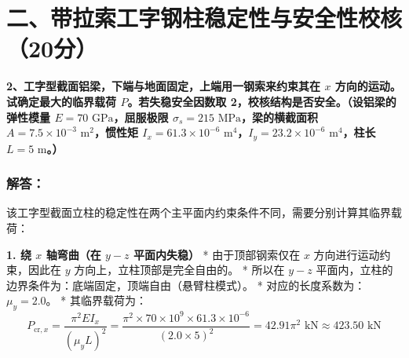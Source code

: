 \documentclass[UTF8,fontset=windows]{ctexart}
\begin{document}
\section*{二、带拉索工字钢柱稳定性与安全性校核（20分）}

\textbf{2、工字型截面铝梁，下端与地面固定，上端用一钢索来约束其在 $x$ 方向的运动。试确定最大的临界载荷 $P$。若失稳安全因数取 2，校核结构是否安全。（设铝梁的弹性模量 $E=70\text{ GPa}$，屈服极限 $\sigma_s=215\text{ MPa}$，梁的横截面积 $A=7.5 \times 10^{-3}\text{ m}^2$，惯性矩 $I_x=61.3 \times 10^{-6}\text{ m}^4$，$I_y=23.2 \times 10^{-6}\text{ m}^4$，柱长 $L=5\text{ m}$。）}

\begin{center}
\end{center}

\subsubsection*{解答：}

该工字型截面立柱的稳定性在两个主平面内约束条件不同，需要分别计算其临界载荷：

\textbf{1. 绕 $x$ 轴弯曲（在 $y-z$ 平面内失稳）}
*   由于顶部钢索仅在 $x$ 方向进行运动约束，因此在 $y$ 方向上，立柱顶部是完全自由的。
*   所以在 $y-z$ 平面内，立柱的边界条件为：底端固定，顶端自由（悬臂柱模式）。
*   对应的长度系数为：$\mu_y = 2.0$。
*   其临界载荷为：
    \[
        P_{\text{cr}, x} = \frac{\pi^2 E I_x}{(\mu_y L)^2} = \frac{\pi^2 \times 70 \times 10^9 \times 61.3 \times 10^{-6}}{(2.0 \times 5)^2} = 42.91 \pi^2\text{ kN} \approx 423.50\text{ kN}
    \]
\end{document}

